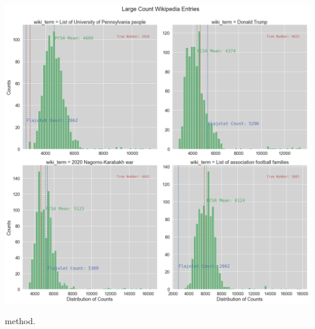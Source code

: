 \documentclass[11pt]{article}
\begin{document}
\begin{center}
\begin{minipage}{1.2\linewidth}
\end{minipage}
\hfill
\begin{minipage}{1.2\linewidth}
\includegraphics[width=\linewidth]{images/distribution_large.png}
\end{minipage}
\end{center}method.
\end{document}
